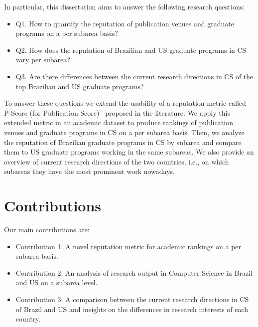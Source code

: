 \documentclass[msc]{ppgccufmg}
\begin{document}
In particular, this dissertation aims to answer the following research questions:
    
\begin{itemize}
    \item Q1. How to quantify the reputation of publication venues and graduate programs on a per subarea basis?     
    \item Q2. How does the reputation of Brazilian and US graduate programs in CS vary per subarea?     
    \item Q3. Are there differences between the current research directions in CS of the top Brazilian and US graduate programs?
\end{itemize}

To answer these questions we extend the usability of a reputation metric called P-Score (for Publication Score)~\citep{ribas2015bigscholar} proposed in the literature. We apply this extended metric in an academic dataset to produce rankings of publication venues and graduate programs in CS on a per subarea basis. Then, we analyze the reputation of Brazilian graduate programs in CS by subarea and compare them to US graduate programs working in the same subareas. We also provide an overview of current research directions of the two countries, i.e., on which subareas they have the most prominent work nowadays.

\newpage

\section{Contributions}
Our main contributions are:

\begin{itemize}
    \item Contribution 1: A novel reputation metric for academic rankings on a per subarea basis.
    \item Contribution 2: An analysis of research output in Computer Science in Brazil and US on a subarea level.
    \item Contribution 3: A comparison between the current research directions in CS of Brazil and US and insights on the differences in research interests of each country.
\end{itemize}

\end{document}
